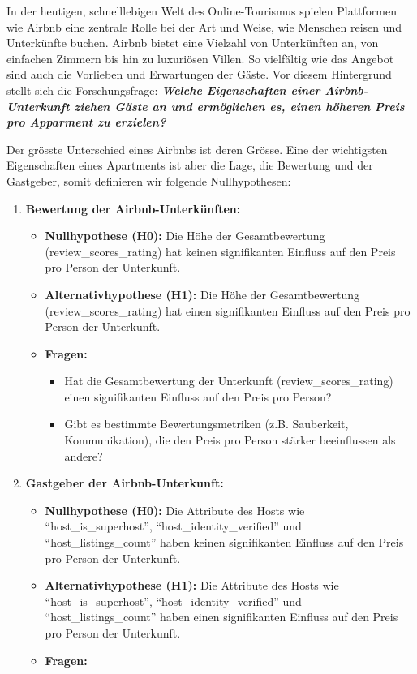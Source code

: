 \documentclass[
  journal,
]{IEEEtran}%
\providecommand{\tightlist}{%
  \setlength{\itemsep}{0pt}\setlength{\parskip}{0pt}}\usepackage{longtable,booktabs,array}
\begin{document}
In der heutigen, schnelllebigen Welt des Online-Tourismus spielen
Plattformen wie Airbnb eine zentrale Rolle bei der Art und Weise, wie
Menschen reisen und Unterkünfte buchen. Airbnb bietet eine Vielzahl von
Unterkünften an, von einfachen Zimmern bis hin zu luxuriösen Villen. So
vielfältig wie das Angebot sind auch die Vorlieben und Erwartungen der
Gäste. Vor diesem Hintergrund stellt sich die Forschungsfrage:
\textbf{\emph{Welche Eigenschaften einer Airbnb-Unterkunft ziehen Gäste
an und ermöglichen es, einen höheren Preis pro Apparment zu erzielen?}}

Der grösste Unterschied eines Airbnbs ist deren Grösse. Eine der
wichtigsten Eigenschaften eines Apartments ist aber die Lage, die
Bewertung und der Gastgeber, somit definieren wir folgende
Nullhypothesen:

\begin{enumerate}
\def\labelenumi{\arabic{enumi}.}
\item
  \textbf{Bewertung der Airbnb-Unterkünften:}

  \begin{itemize}
  \tightlist
  \item
    \textbf{Nullhypothese (H0):} Die Höhe der Gesamtbewertung
    (review\_scores\_rating) hat keinen signifikanten Einfluss auf den
    Preis pro Person der Unterkunft.
  \item
    \textbf{Alternativhypothese (H1):} Die Höhe der Gesamtbewertung
    (review\_scores\_rating) hat einen signifikanten Einfluss auf den
    Preis pro Person der Unterkunft.
  \item
    \textbf{Fragen:}

    \begin{itemize}
    \tightlist
    \item
      Hat die Gesamtbewertung der Unterkunft (review\_scores\_rating)
      einen signifikanten Einfluss auf den Preis pro Person?
    \item
      Gibt es bestimmte Bewertungsmetriken (z.B. Sauberkeit,
      Kommunikation), die den Preis pro Person stärker beeinflussen als
      andere?
    \end{itemize}
  \end{itemize}
\item
  \textbf{Gastgeber der Airbnb-Unterkunft:}

  \begin{itemize}
  \tightlist
  \item
    \textbf{Nullhypothese (H0):} Die Attribute des Hosts wie
    ``host\_is\_superhost'', ``host\_identity\_verified'' und
    ``host\_listings\_count'' haben keinen signifikanten Einfluss auf
    den Preis pro Person der Unterkunft.
  \item
    \textbf{Alternativhypothese (H1):} Die Attribute des Hosts wie
    ``host\_is\_superhost'', ``host\_identity\_verified'' und
    ``host\_listings\_count'' haben einen signifikanten Einfluss auf den
    Preis pro Person der Unterkunft.
  \item
    \textbf{Fragen:}


\end{itemize}
\end{enumerate}
\end{document}
